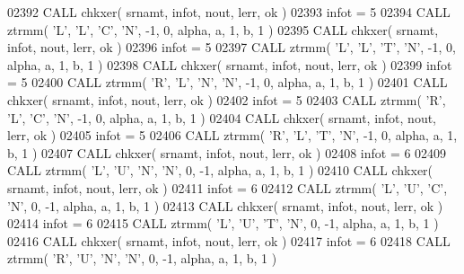 \begin{DoxyCode}
02392       \textcolor{keyword}{CALL }chkxer( srnamt, infot, nout, lerr, ok )
02393       infot = 5
02394       \textcolor{keyword}{CALL }ztrmm( \textcolor{stringliteral}{'L'}, \textcolor{stringliteral}{'L'}, \textcolor{stringliteral}{'C'}, \textcolor{stringliteral}{'N'}, -1, 0, alpha, a, 1, b, 1 )
02395       \textcolor{keyword}{CALL }chkxer( srnamt, infot, nout, lerr, ok )
02396       infot = 5
02397       \textcolor{keyword}{CALL }ztrmm( \textcolor{stringliteral}{'L'}, \textcolor{stringliteral}{'L'}, \textcolor{stringliteral}{'T'}, \textcolor{stringliteral}{'N'}, -1, 0, alpha, a, 1, b, 1 )
02398       \textcolor{keyword}{CALL }chkxer( srnamt, infot, nout, lerr, ok )
02399       infot = 5
02400       \textcolor{keyword}{CALL }ztrmm( \textcolor{stringliteral}{'R'}, \textcolor{stringliteral}{'L'}, \textcolor{stringliteral}{'N'}, \textcolor{stringliteral}{'N'}, -1, 0, alpha, a, 1, b, 1 )
02401       \textcolor{keyword}{CALL }chkxer( srnamt, infot, nout, lerr, ok )
02402       infot = 5
02403       \textcolor{keyword}{CALL }ztrmm( \textcolor{stringliteral}{'R'}, \textcolor{stringliteral}{'L'}, \textcolor{stringliteral}{'C'}, \textcolor{stringliteral}{'N'}, -1, 0, alpha, a, 1, b, 1 )
02404       \textcolor{keyword}{CALL }chkxer( srnamt, infot, nout, lerr, ok )
02405       infot = 5
02406       \textcolor{keyword}{CALL }ztrmm( \textcolor{stringliteral}{'R'}, \textcolor{stringliteral}{'L'}, \textcolor{stringliteral}{'T'}, \textcolor{stringliteral}{'N'}, -1, 0, alpha, a, 1, b, 1 )
02407       \textcolor{keyword}{CALL }chkxer( srnamt, infot, nout, lerr, ok )
02408       infot = 6
02409       \textcolor{keyword}{CALL }ztrmm( \textcolor{stringliteral}{'L'}, \textcolor{stringliteral}{'U'}, \textcolor{stringliteral}{'N'}, \textcolor{stringliteral}{'N'}, 0, -1, alpha, a, 1, b, 1 )
02410       \textcolor{keyword}{CALL }chkxer( srnamt, infot, nout, lerr, ok )
02411       infot = 6
02412       \textcolor{keyword}{CALL }ztrmm( \textcolor{stringliteral}{'L'}, \textcolor{stringliteral}{'U'}, \textcolor{stringliteral}{'C'}, \textcolor{stringliteral}{'N'}, 0, -1, alpha, a, 1, b, 1 )
02413       \textcolor{keyword}{CALL }chkxer( srnamt, infot, nout, lerr, ok )
02414       infot = 6
02415       \textcolor{keyword}{CALL }ztrmm( \textcolor{stringliteral}{'L'}, \textcolor{stringliteral}{'U'}, \textcolor{stringliteral}{'T'}, \textcolor{stringliteral}{'N'}, 0, -1, alpha, a, 1, b, 1 )
02416       \textcolor{keyword}{CALL }chkxer( srnamt, infot, nout, lerr, ok )
02417       infot = 6
02418       \textcolor{keyword}{CALL }ztrmm( \textcolor{stringliteral}{'R'}, \textcolor{stringliteral}{'U'}, \textcolor{stringliteral}{'N'}, \textcolor{stringliteral}{'N'}, 0, -1, alpha, a, 1, b, 1 )

\end{DoxyCode}
